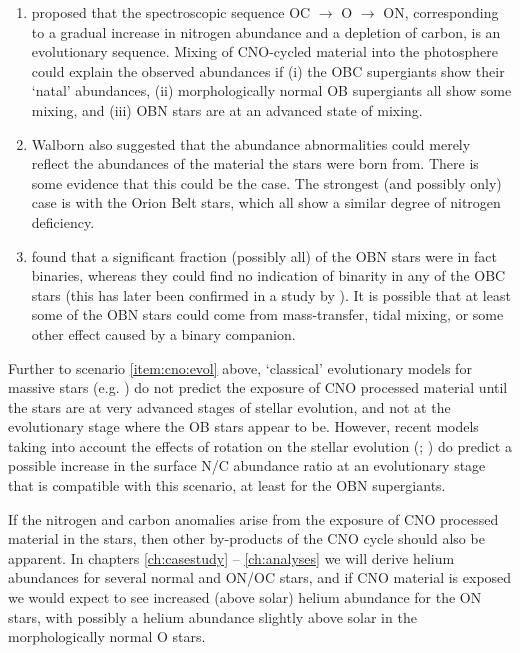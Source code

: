 \begin{enumerate}
\item	{} proposed that the spectroscopic sequence OC
	$\rightarrow$ O $\rightarrow$ ON, corresponding to a gradual
	increase in nitrogen abundance and a depletion of carbon, is
	an evolutionary sequence. Mixing of CNO-cycled material into
	the photosphere could explain the observed abundances if (i)
	the OBC supergiants show their `natal' abundances, (ii)
	morphologically normal OB supergiants all show some mixing, and
	(iii) OBN stars are at an advanced state of mixing.
	\label{item:cno:evol}

\item	Walborn also suggested that the abundance abnormalities could
	merely reflect the abundances of the material the stars were
	born from. There is some evidence that this could be the
	case. The strongest (and possibly only) case is with the Orion
	Belt stars, which all show a similar degree of nitrogen
	deficiency.

\item	{} found that a significant fraction (possibly all) 
	of the OBN stars were in fact binaries, whereas they could
	find no indication of binarity in any of the OBC stars (this
	has later been confirmed in a study by
	\cite{1988ApJS...68..319L}). It is possible that at least some
	of the OBN stars could come from mass-transfer, tidal mixing,
	or some other effect caused by a binary companion.
\end{enumerate}

Further to scenario \ref{item:cno:evol} above, `classical'
evolutionary models for massive stars (e.g. \cite{schaller:92}) do not
predict the exposure of CNO processed material until the stars are at
very advanced stages of stellar evolution, and not at the evolutionary
stage where the OB stars appear to be. However, recent models taking
into account the effects of rotation on the stellar evolution
(\cite{ma:98}; \cite{me:98}) do predict a possible increase in the
surface N/C abundance ratio at an evolutionary stage that is
compatible with this scenario, at least for the OBN supergiants.

If the nitrogen and carbon anomalies arise from the exposure of CNO
processed material in the stars, then other by-products of the CNO
cycle should also be apparent. In chapters \ref{ch:casestudy} --
\ref{ch:analyses} we will derive helium abundances for several normal
and ON/OC stars, and if CNO material is exposed we would expect to
see increased (above solar) helium abundance for the ON stars, with
possibly a helium abundance slightly above solar in the morphologically
normal O stars. 


